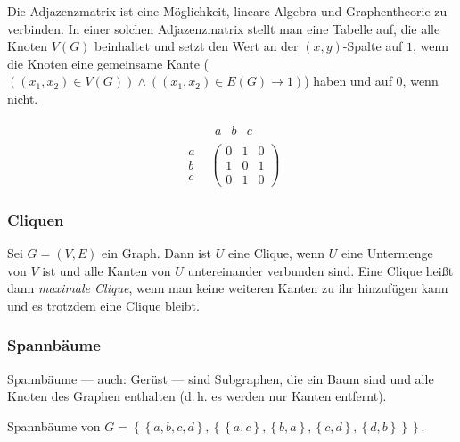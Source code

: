 \documentclass{scrartcl}
\begin{document}
\label{adjazenzmatrix}

Die Adjazenzmatrix ist eine Möglichkeit, lineare Algebra und Graphentheorie zu verbinden. In einer solchen Adjazenzmatrix 
stellt man eine Tabelle auf, die alle Knoten $V(G)$ beinhaltet und setzt den Wert an der $(x, y)$-Spalte auf $1$, wenn die
Knoten eine gemeinsame Kante ($\left(\left(x_1, x_2\right) \in V(G)\right) \wedge \left(\left(x_1, x_2\right) \in E(G) \longrightarrow 1\right)$) haben und auf $0$, wenn nicht.

\begin{equation}
	\begin{array}{r|c}
	  & \begin{matrix} a & b & c \end{matrix} \\
	  \hline
	  \begin{matrix}
			a\\
			b\\
			c
		\end{matrix} &
		\begin{pmatrix*}
			0 & 1 & 0\\
			1 & 0 & 1\\
			0 & 1 & 0
		\end{pmatrix*}
	\end{array}
\end{equation}

\subsubsection{Cliquen}

Sei $G = (V, E)$ ein Graph. Dann ist $U$ eine Clique, wenn $U$ eine Untermenge von $V$ ist und alle Kanten von $U$ untereinander verbunden
sind.
Eine Clique heißt dann \textit{maximale Clique}, wenn man keine weiteren Kanten zu ihr hinzufügen kann und es trotzdem eine Clique
bleibt.

\subsubsection{Spannbäume}


Spannbäume --- auch: Gerüst --- sind Subgraphen, die ein Baum sind und alle Knoten
des Graphen enthalten (d.\,h. es werden nur Kanten entfernt).

Spannbäume von $G = \left\{\left\{a, b, c, d\right\}, \left\{
	\left\{a, c\right\},
	\left\{b, a\right\},
	\left\{c, d\right\},
	\left\{d, b\right\}
\right\}\right\}$.

\end{document}
